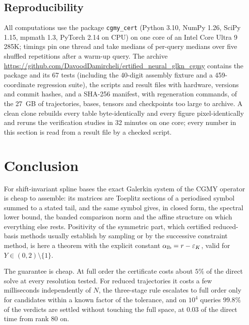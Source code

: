 \documentclass[hidelinks]{siamart251216}
\newcommand{\rf}{r}
\begin{document}
\subsection{Reproducibility}
\label{ssec:archive}
All computations use the package \texttt{cgmy\_cert} (Python 3.10, NumPy 1.26, SciPy 1.15, mpmath
1.3, PyTorch 2.14 on CPU) on one core of an Intel Core Ultra 9 285K; timings pin one thread and take
medians of per-query medians over five shuffled repetitions after a warm-up query.  The archive
\url{https://github.com/DavoodDamircheli/ertified_neural_glkn_cgmy} contains the package and its 67
tests (including the 40-digit assembly fixture and a 459-coordinate regression suite), the scripts and
result files with hardware, versions and commit hashes, and a SHA-256 manifest, with regeneration
commands, of the 27~GB of trajectories, bases, tensors and checkpoints too large to archive.  A clean
clone rebuilds every table byte-identically and every figure pixel-identically and reruns the
verification studies in 32 minutes on one core; every number in this section is read from a result
file by a checked script.
\FloatBarrier

\section{Conclusion}
\label{sec:conclusion}\label{sec:discussion}
For shift-invariant spline bases the exact Galerkin system of the CGMY operator is cheap to
assemble: its matrices are Toeplitz sections of a periodised symbol summed to a stated tail, and the
same symbol gives, in closed form, the spectral lower bound, the banded comparison norm and the affine
structure on which everything else rests.  Positivity of the symmetric part, which certified
reduced-basis methods usually establish by sampling or by the successive constraint method, is here
a theorem with the explicit constant $\alpha_{\rm lb}=\rf-\varepsilon_K$, valid for
$Y\in(0,2)\setminus\{1\}$.

The guarantee is cheap.  At full order the certificate costs about $5\%$ of the direct solve at every
resolution tested.  For reduced trajectories it costs a few milliseconds independently of $N$, the
three-stage rule escalates to full order only for candidates within a known factor of the tolerance,
and on $10^4$ queries $99.8\%$ of the verdicts are settled without touching the full space, at $0.03$
of the direct time from rank $80$ on.
\end{document}
